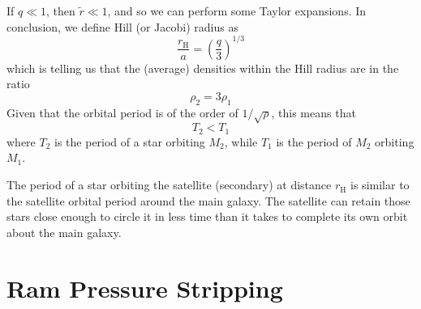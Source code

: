 If $q \ll 1$, then $\tilde{r}\ll 1$, and so we can perform some Taylor expansions. In conclusion, we define Hill (or Jacobi) radius as 
\begin{equation}
    \boxed{
    \frac{r_{\text{H}}}{a} = \left(\frac{q}{3}\right)^{1/3}
    }
    \label{eq:hillradius}
\end{equation}
which is telling us that the (average) densities within the Hill radius are in the ratio 
\begin{equation*}
    \rho_{2} = 3\rho_{1}
\end{equation*}
Given that the orbital period is of the order of $1/\sqrt{\rho}$, this means that 
\begin{equation*}
    T_{2} < T_{1}
\end{equation*}
where $T_{2}$ is the period of a star orbiting $M_{2}$, while $T_{1}$ is the period of $M_{2}$ orbiting $M_{1}$.
\par The period of a star orbiting the satellite (secondary) at distance $r_{\text{H}}$ is similar to the satellite orbital period around the main galaxy. The satellite can retain those stars close enough to circle it in less time than it takes to complete its own orbit about the main galaxy.

\section{Ram Pressure Stripping}

